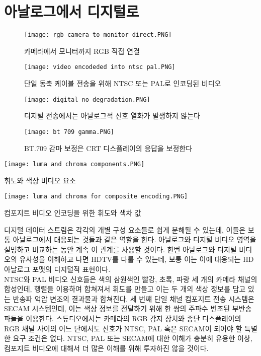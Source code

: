\chapter{아날로그에서 디지털로}
\begin{figure*}[!h]
    \centering
    \texttt{[image: rgb camera to monitor direct.PNG]}
    \caption{카메라에서 모니터까지 RGB 직접 연결}\label{fig:rgb camera to monitor direct}
\end{figure*}
\begin{figure*}[!h]
    \centering
    \texttt{[image: video encodeded into ntsc pal.PNG]}
    \caption{단일 동축 케이블 전송을 위해 NTSC 또는 PAL로 인코딩된 비디오}\label{fig:video encodeded into ntsc pal}
\end{figure*}
\begin{figure*}[!h]
    \centering
    \texttt{[image: digital no degradation.PNG]}
    \caption{디지털 전송에서는 아날로그적 신호 열화가 발생하지 않는다}\label{fig:digital no degradation}
\end{figure*}
\begin{figure*}[t!]
    \centering
    \texttt{[image: bt 709 gamma.PNG]}
    \caption{BT.709 감마 보정은 CRT 디스플레이의 응답을 보정한다}\label{fig:bt 709 gamma}
\end{figure*}
\begin{tab*}[t]
    \centering
    \texttt{[image: luma and chroma components.PNG]}
    \caption{휘도와 색상 비디오 요소}\label{table:luma and chroma components}
\end{tab*}
\begin{tab}[hpb!]
    \centering
    \texttt{[image: luma and chroma for composite encoding.PNG]}
    \caption{컴포지트 비디오 인코딩을 위한 휘도와 색차 값}\label{table:luma and chroma for composite encoding}
\end{tab}
디지털 데이터 스트림은 각각의 개별 구성 요소들로 쉽게 분해될 수 있는데, 이들은 보통 아날로그에서 대응되는 것들과 같은 역할을 한다.
아날로그와 디지털 비디오 영역을 설명하고 비교하는 동안 계속 이 관계를 사용할 것이다.
한번 아날로그와 디지털 비디오의 유사성을 이해하고 나면 HDTV를 다룰 수 있는데, 보통 이는 이에 대응되는 HD 아날로그 포맷의 디지털적 표현이다.
\\
NTSC와 PAL 비디오 신호들은 색의 삼원색인 빨강, 초록, 파랑 세 개의 카메라 채널의 합성인데, 행렬을 이용하여 합쳐져서 휘도를 만들고 이는 두 개의 색상 정보를 담고 있는 반송파 억압 변조의 결과물과 합쳐진다.
세 번쨰 단일 채널 컴포지트 전송 시스템은 SECAM 시스템인데, 이는 색상 정보를 전달하기 위해 한 쌍의 주파수 변조된 부반송파들을 이용한다.
스튜디오에서는 카메라의 RGB 감지 장치와 종단 디스플레이의 RGB 채널 사이의 어느 단에서도 신호가 NTSC, PAL 혹은 SECAM이 되어야 할 특별한 요구 조건은 없다.
NTSC, PAL 또는 SECAM에 대한 이해가 충분히 유용한 이상, 컴포지트 비디오에 대해서 더 많은 이해를 위해 투자하진 않을 것이다.

